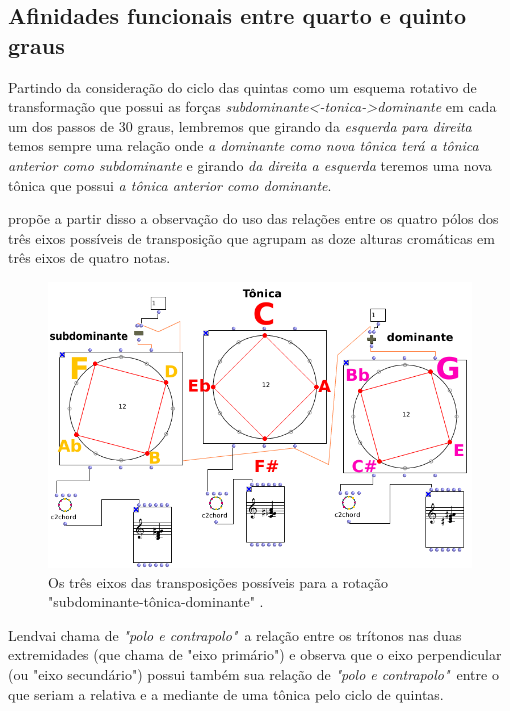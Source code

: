 \documentclass[
	12pt,				%
	openright,			%
	twoside,			%
	a4paper,			%
	english,			%
	french,				%
	spanish,			%
	brazil				%
	]{abntex2}
\begin{document}
\subsection{Afinidades funcionais entre quarto e quinto graus}

Partindo da consideração do ciclo das quintas como um esquema rotativo de transformação que possui as forças \textit{subdominante<-tonica->dominante} em cada um dos passos de 30 graus, lembremos que girando da \textit{esquerda para direita} temos sempre uma relação onde \textit{a dominante como nova tônica terá a tônica anterior como subdominante} e girando \textit{da direita a esquerda} teremos uma nova tônica que possui \textit{a tônica anterior como dominante}. 

 propõe a partir disso a observação do uso das relações entre os quatro pólos dos três eixos possíveis de transposição que agrupam as doze alturas cromáticas em três eixos de quatro notas. 

\begin{figure}[!h]
	\caption{\label{fig_grafico}Os três eixos das transposições possíveis para a rotação "subdominante-tônica-dominante" .}
	\begin{center}
	    \includegraphics[scale=0.45]{axis/axisOM.png}
	\end{center}
\end{figure}


Lendvai chama de \textit{"polo e contrapolo"}\ a relação entre os trítonos nas duas extremidades (que chama de "eixo primário") e observa que o eixo perpendicular (ou "eixo secundário") possui também sua relação de \textit{"polo e contrapolo"}\ entre o que seriam a relativa e a mediante de uma tônica pelo ciclo de quintas. 
\end{document}
